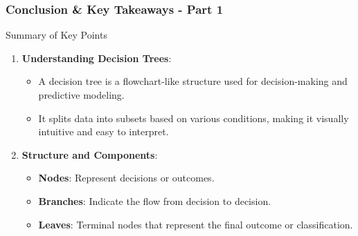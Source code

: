 \documentclass[aspectratio=169]{beamer}
\begin{document}
\begin{frame}[fragile]
    \frametitle{Conclusion \& Key Takeaways - Part 1}
    \begin{block}{Summary of Key Points}
        \begin{enumerate}
            \item \textbf{Understanding Decision Trees}:
            \begin{itemize}
                \item A decision tree is a flowchart-like structure used for decision-making and predictive modeling.
                \item It splits data into subsets based on various conditions, making it visually intuitive and easy to interpret.
            \end{itemize}
            
            \item \textbf{Structure and Components}:
            \begin{itemize}
                \item \textbf{Nodes}: Represent decisions or outcomes.
                \item \textbf{Branches}: Indicate the flow from decision to decision.
                \item \textbf{Leaves}: Terminal nodes that represent the final outcome or classification.
            \end{itemize}
        \end{enumerate}
    \end{block}
\end{frame}
\end{document}
